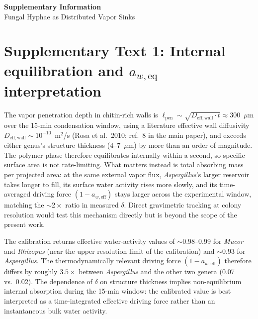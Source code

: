 \documentclass[11pt]{article}
\begin{document}
\begin{center}
{\Large \textbf{Supplementary Information}}\\[0.5em]
{\large Fungal Hyphae as Distributed Vapor Sinks}
\end{center}

\vspace{1cm}


\section*{Supplementary Text 1: Internal equilibration and $a_{w,\mathrm{eq}}$ interpretation}

The vapor penetration depth in chitin-rich walls is $\ell_{\mathrm{pen}} \sim \sqrt{D_{\mathrm{eff,wall}} \cdot t} \approx 300$~$\mu$m over the 15-min condensation window, using a literature effective wall diffusivity $D_{\mathrm{eff,wall}} \sim 10^{-10}$~m$^2$/s (Rosa et al.\ 2010; ref.\ 8 in the main paper), and exceeds either genus's structure thickness (4--7~$\mu$m) by more than an order of magnitude. The polymer phase therefore equilibrates internally within a second, so specific surface area is not rate-limiting. What matters instead is total absorbing mass per projected area: at the same external vapor flux, \textit{Aspergillus}'s larger reservoir takes longer to fill, its surface water activity rises more slowly, and its time-averaged driving force $(1 - a_{w,\mathrm{eff}})$ stays larger across the experimental window, matching the $\sim 2\times$ ratio in measured $\delta$. Direct gravimetric tracking at colony resolution would test this mechanism directly but is beyond the scope of the present work.

The calibration returns effective water-activity values of $\sim 0.98$--0.99 for \textit{Mucor} and \textit{Rhizopus} (near the upper resolution limit of the calibration) and $\sim 0.93$ for \textit{Aspergillus}. The thermodynamically relevant driving force $(1 - a_{w,\mathrm{eff}})$ therefore differs by roughly $3.5\times$ between \textit{Aspergillus} and the other two genera (0.07 vs.\ 0.02). The dependence of $\delta$ on structure thickness implies non-equilibrium internal absorption during the 15-min window: the calibrated value is best interpreted as a time-integrated effective driving force rather than an instantaneous bulk water activity.

\clearpage
\end{document}
